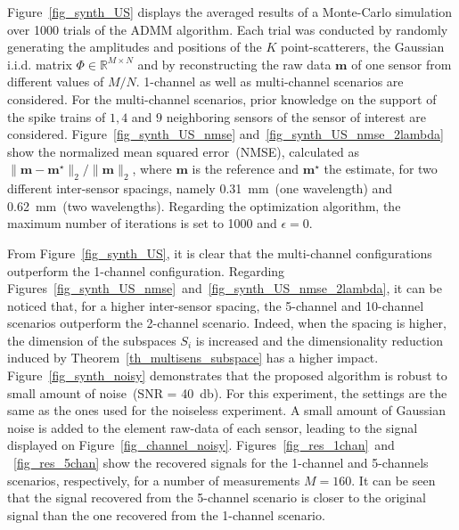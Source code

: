 \documentclass{article}
\newcommand{\vect}[1]{\bm{#1}}
\newcommand{\mat}[1]{\mathsf{#1}}
\theoremstyle{definition}
\begin{document}
Figure~\ref{fig_synth_US} displays the averaged results of a Monte-Carlo simulation over \num{1000} trials of the ADMM algorithm. 
Each trial was conducted by randomly generating the amplitudes and positions of the $K$ point-scatterers, the Gaussian i.i.d. matrix $\mat{\Phi} \in \mathbb{R}^{M \times N}$ and by reconstructing the raw data $\vect{m}$ of one sensor from different values of $M/N$. 1-channel as well as multi-channel scenarios are considered. 
For the multi-channel scenarios, prior knowledge on the support of the spike trains of $1, 4$ and $9$ neighboring sensors of the sensor of interest are considered. 
Figure~\ref{fig_synth_US_nmse} and~\ref{fig_synth_US_nmse_2lambda} show the normalized mean squared error~(NMSE), calculated as $\| \vect{m} - \vect{m}^\star \|_2 / \| \vect{m}\|_2$, where $\vect{m}$ is the reference and $\vect{m}^\star$ the estimate, for two different inter-sensor spacings, namely \SI{0.31}{\milli\metre}~(one wavelength) and \SI{0.62}{\milli\metre}~(two wavelengths). 
Regarding the optimization algorithm, the maximum number of iterations is set to \num{1000} and $\epsilon = 0$. 

From Figure~\ref{fig_synth_US}, it is clear that the multi-channel configurations outperform the 1-channel configuration. 
Regarding Figures~\ref{fig_synth_US_nmse}~and~\ref{fig_synth_US_nmse_2lambda}, it can be noticed that, for a higher inter-sensor spacing, the \num{5}-channel and \num{10}-channel scenarios outperform the \num{2}-channel scenario. 
Indeed, when the spacing is higher, the dimension of the subspaces $S_i$ is increased and the dimensionality reduction induced by Theorem~\ref{th_multisens_subspace} has a higher impact.
Figure~\ref{fig_synth_noisy} demonstrates that the proposed algorithm is robust to small amount of noise~(SNR = \SI{40}{\decibel}). 
For this experiment, the settings are the same as the ones used for the noiseless experiment. 
A small amount of Gaussian noise is added to the element raw-data of each sensor, leading to the signal displayed on Figure~\ref{fig_channel_noisy}. Figures~\ref{fig_res_1chan}~and ~\ref{fig_res_5chan} show the recovered signals for the \num{1}-channel and \num{5}-channels scenarios, respectively, for a number of measurements $M=160$. 
It can be seen that the signal recovered from the \num{5}-channel scenario is closer to the original signal than the one recovered from the \num{1}-channel scenario.
\end{document}
